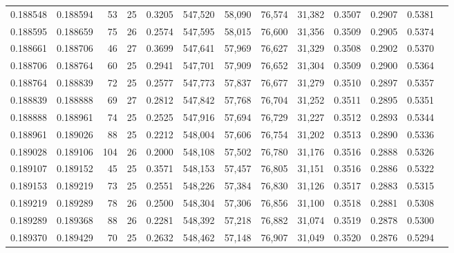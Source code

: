 \begin{tabular}{rrrrrrrrrrrrr}
0.188548 & 0.188594 &    53 &  25 &                                     0.3205 & 547,520 &  58,090 &  76,574 &  31,382 & 0.3507 & 0.2907 & 0.5381 \\
0.188595 & 0.188659 &    75 &  26 &                                     0.2574 & 547,595 &  58,015 &  76,600 &  31,356 & 0.3509 & 0.2905 & 0.5374 \\
0.188661 & 0.188706 &    46 &  27 &                                     0.3699 & 547,641 &  57,969 &  76,627 &  31,329 & 0.3508 & 0.2902 & 0.5370 \\
0.188706 & 0.188764 &    60 &  25 &                                     0.2941 & 547,701 &  57,909 &  76,652 &  31,304 & 0.3509 & 0.2900 & 0.5364 \\
0.188764 & 0.188839 &    72 &  25 &                                     0.2577 & 547,773 &  57,837 &  76,677 &  31,279 & 0.3510 & 0.2897 & 0.5357 \\
0.188839 & 0.188888 &    69 &  27 &                                     0.2812 & 547,842 &  57,768 &  76,704 &  31,252 & 0.3511 & 0.2895 & 0.5351 \\
0.188888 & 0.188961 &    74 &  25 &                                     0.2525 & 547,916 &  57,694 &  76,729 &  31,227 & 0.3512 & 0.2893 & 0.5344 \\
0.188961 & 0.189026 &    88 &  25 &                                     0.2212 & 548,004 &  57,606 &  76,754 &  31,202 & 0.3513 & 0.2890 & 0.5336 \\
0.189028 & 0.189106 &   104 &  26 &                                     0.2000 & 548,108 &  57,502 &  76,780 &  31,176 & 0.3516 & 0.2888 & 0.5326 \\
0.189107 & 0.189152 &    45 &  25 &                                     0.3571 & 548,153 &  57,457 &  76,805 &  31,151 & 0.3516 & 0.2886 & 0.5322 \\
0.189153 & 0.189219 &    73 &  25 &                                     0.2551 & 548,226 &  57,384 &  76,830 &  31,126 & 0.3517 & 0.2883 & 0.5315 \\
0.189219 & 0.189289 &    78 &  26 &                                     0.2500 & 548,304 &  57,306 &  76,856 &  31,100 & 0.3518 & 0.2881 & 0.5308 \\
0.189289 & 0.189368 &    88 &  26 &                                     0.2281 & 548,392 &  57,218 &  76,882 &  31,074 & 0.3519 & 0.2878 & 0.5300 \\
0.189370 & 0.189429 &    70 &  25 &                                     0.2632 & 548,462 &  57,148 &  76,907 &  31,049 & 0.3520 & 0.2876 & 0.5294 \\

\end{tabular}
